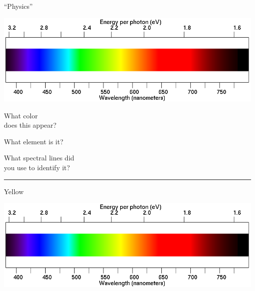 \documentclass[11pt]{article}
\begin{document}
\vspace{1.2in}



\begin{minipage}{0.1\textwidth}
	\begin{center}
		\large ``Physics''
	\end{center}
\end{minipage}
\begin{minipage}{0.7\textwidth}
	\includegraphics[width=\textwidth]{spectrum2.png}
\end{minipage}

\begin{minipage}{0.33\textwidth}
	What color \\does this appear?
\end{minipage}
\begin{minipage}{0.33\textwidth}
	What element is it?
\end{minipage}
\begin{minipage}{0.33\textwidth}
	What spectral lines did\\
	you use to identify it?
\end{minipage}

\vspace{1.2in}
\hrule



\begin{minipage}{0.1\textwidth}
	\begin{center}
		\large Yellow
	\end{center}
\end{minipage}
\begin{minipage}{0.7\textwidth}
	\includegraphics[width=\textwidth]{spectrum2.png}
\end{minipage}
\end{document}
